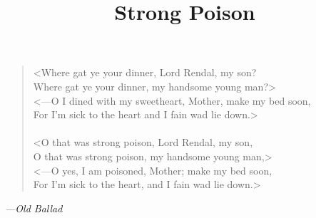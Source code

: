 \documentclass[
a5paper,
]{scrbook} %
\title{Strong Poison}
\begin{document}
\frontmatter
\pagestyle{empty}




\tableofcontents

\cleardoubleoddpage

\vfill
\begin{verse}
<Where gat ye your dinner, Lord Rendal, my son?\\
Where gat ye your dinner, my handsome young man?>\\
<—O I dined with my sweetheart, Mother, make my bed soon,\\
For I'm sick to the heart and I fain wad lie down.>\\
~\\
<O that was strong poison, Lord Rendal, my son,\\
O that was strong poison, my handsome young man,>\\
<—O yes, I am poisoned, Mother; make my bed soon,\\
For I'm sick to the heart, and I fain wad lie down.>
\end{verse}
\begin{flushright}\itshape
—Old Ballad
\end{flushright}
\vfill
\clearpage

\mainmatter
\pagestyle{headings}
\renewcommand*{\chapterpagestyle}{plain}

























\clearpage
{}
\end{document}
